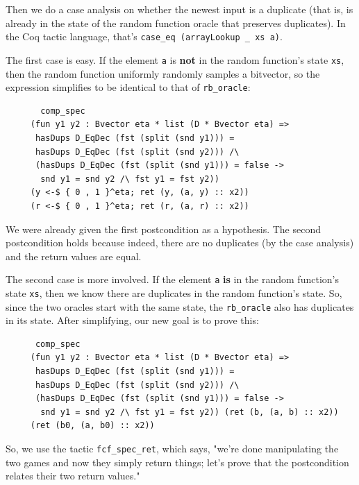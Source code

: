 \documentclass[12pt,lot, lof]{puthesis}
\newcommand{\li} {\lstinline}
\begin{document}
{\begin{enumerate}
Then we do a case analysis on whether the newest input is a duplicate (that is, is already in the state of the random function oracle that preserves duplicates). In the Coq tactic language, that's \li|case_eq (arrayLookup _ xs a)|.

	The first case is easy. If the element \li|a| is \textbf{not} in the random function's state \li|xs|, then the random function uniformly randomly samples a bitvector, so the expression simplifies to be identical to that of \li|rb_oracle|:
	
	\begin{lstlisting}
	   comp_spec
     (fun y1 y2 : Bvector eta * list (D * Bvector eta) =>
      hasDups D_EqDec (fst (split (snd y1))) =
      hasDups D_EqDec (fst (split (snd y2))) /\
      (hasDups D_EqDec (fst (split (snd y1))) = false ->
       snd y1 = snd y2 /\ fst y1 = fst y2))
     (y <-$ { 0 , 1 }^eta; ret (y, (a, y) :: x2))
     (r <-$ { 0 , 1 }^eta; ret (r, (a, r) :: x2))
     \end{lstlisting}
     
     We were already given the first postcondition as a hypothesis. The second postcondition holds because indeed, there are no duplicates (by the case analysis) and the return values are equal.

	The second case is more involved. If the element \li|a| \textbf{is} in the random function's state \li|xs|, then we know there are duplicates in the random function's state. So, since the two oracles start with the same state, the \li|rb_oracle| also has duplicates in its state. After simplifying, our new goal is to prove this:
	
	\begin{lstlisting}
	  comp_spec
     (fun y1 y2 : Bvector eta * list (D * Bvector eta) =>
      hasDups D_EqDec (fst (split (snd y1))) =
      hasDups D_EqDec (fst (split (snd y2))) /\
      (hasDups D_EqDec (fst (split (snd y1))) = false ->
       snd y1 = snd y2 /\ fst y1 = fst y2)) (ret (b, (a, b) :: x2))
     (ret (b0, (a, b0) :: x2))
     \end{lstlisting}
	
	
	So, we use the tactic \li|fcf_spec_ret|, which says, "we're done manipulating the two games and now they simply return things; let's prove that the postcondition relates their two return values."
	

\end{enumerate}}
\end{document}
